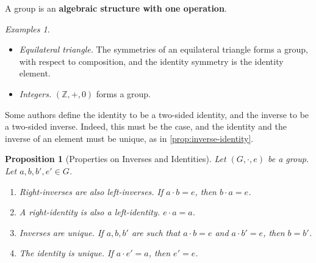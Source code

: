 \documentclass{article}
\newtheorem{proposition}[theorem]{Proposition}
\theoremstyle{definition}
\theoremstyle{remark}
\newcommand{\pqty}[1]{\left(#1\right)}
\newcommand{\ZZ}{\mathbb{Z}}
\newtheorem*{examples*}{Examples}
\begin{document}
A group is an \textbf{algebraic structure with one operation}.

\begin{examples*}
    \begin{itemize}
        \item \emph{Equilateral triangle.} The symmetries of an equilateral triangle forms a group, with respect to composition, and the identity symmetry is the identity element.
        \item \emph{Integers.} \(\pqty{\ZZ, +, 0}\) forms a group.
    \end{itemize}
\end{examples*}

Some authors define the identity to be a two-sided identity, and the inverse to be a two-sided inverse. Indeed, this must be the case, and the identity and the inverse of an element must be unique, as in \autoref{prop:inverse-identity}.

\begin{proposition}[Properties on Inverses and Identities]
    \label{prop:inverse-identity}%
    Let \(\pqty{G, \cdot, e}\) be a group. Let \(a, b, b', e' \in G\).

    \begin{enumerate}
        \item \emph{Right-inverses are also left-inverses.} If \(a \cdot b = e\), then \(b \cdot a = e\).
        \item \emph{A right-identity is also a left-identity.} \(e \cdot a = a\).
        \item \emph{Inverses are unique.} If \(a, b, b'\) are such that \(a \cdot b = e\) and \(a \cdot b' = e\), then \(b = b'\).
        \item \emph{The identity is unique.} If \(a \cdot e' = a\), then \(e' = e\).
    \end{enumerate}
\end{proposition}
\end{document}
